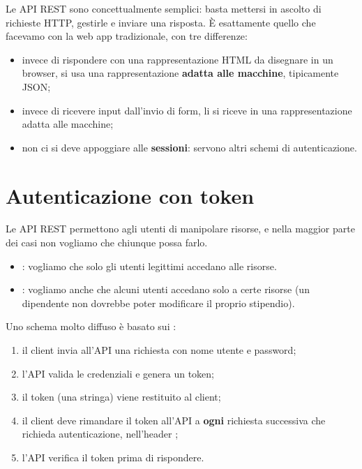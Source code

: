 Le API REST sono concettualmente semplici: basta mettersi in ascolto di
richieste HTTP, gestirle e inviare una risposta. È esattamente quello che
facevamo con la web app tradizionale, con tre differenze:

\begin{itemize}
  \item invece di rispondere con una rappresentazione HTML da disegnare in un
        browser, si usa una rappresentazione \textbf{adatta alle macchine},
        tipicamente JSON;
  \item invece di ricevere input dall'invio di form, li si riceve in una
        rappresentazione adatta alle macchine;
  \item non ci si deve appoggiare alle \textbf{sessioni}: servono altri schemi
        di autenticazione.
\end{itemize}

\section{Autenticazione con token}

Le API REST permettono agli utenti di manipolare risorse, e nella maggior parte
dei casi non vogliamo che chiunque possa farlo.

\begin{itemize}
  \item {}: vogliamo che solo gli utenti legittimi accedano
        alle risorse.
  \item {}: vogliamo anche che alcuni utenti accedano solo a
        certe risorse (un dipendente non dovrebbe poter modificare il proprio
        stipendio).
\end{itemize}

Uno schema molto diffuso è basato sui :

\begin{enumerate}
  \item il client invia all'API una richiesta con nome utente e password;
  \item l'API valida le credenziali e genera un token;
  \item il token (una stringa) viene restituito al client;
  \item il client deve rimandare il token all'API a \textbf{ogni} richiesta
        successiva che richieda autenticazione, nell'header
        ;
  \item l'API verifica il token prima di rispondere.
\end{enumerate}

